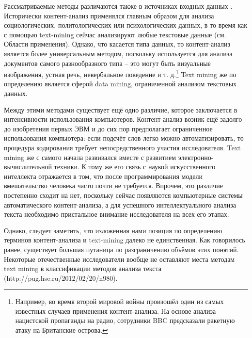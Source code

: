 Рассматриваемые методы различаются также в источниках входных данных \cite[стр. 735]{tm_and_ca}. Исторически контент-анализ применялся главным образом для анализа социологических, политологических или психологических данных, в то время как с помощью text-mining сейчас анализируют любые текстовые данные (см. Области применения). Однако, что касается типа данных, то контент-анализ является более универсальным методом, поскольку используется для анализа документов самого разнообразного типа -- это могут быть визуальные изображения, устная речь, невербальное поведение и т. д.\footnote{Например, во время второй мировой войны произошёл один из самых известных случаев применения контент-анализа. На основе анализа нацистской пропаганды на радио, сотрудники BBC предсказали ракетную атаку на Британские острова.} Text mining же по определению является сферой data mining, ограниченной анализом текстовых данных.

Между этими методами существует ещё одно различие, которое заключается в интенсивности использования компьютеров. Контент-анализ возник ещё задолго до изобретения первых ЭВМ и до сих пор предполагает ограниченное использования компьютера: если подсчёт слов легко можно автоматизировать, то процедура кодирования требует непосредственного участия исследователя. Text mining же с самого начала развивался вместе с развитием электронно-вычислительной техники. К тому же его связь с наукой искусственного интеллекта отражается в том, что после программирования модели вмешательство человека часто почти не требуется. Впрочем, это различие постепенно сходит на нет, поскольку сейчас появляются компьютерные системы автоматического контент-анализа, а для успешного интеллектуального анализа текста необходимо пристальное внимание исследователя на всех его этапах.

Однако, следует заметить, что изложенная нами позиция по определению терминов контент-анализа и text-mining далеко не единственная. Как говорилось ранее, существует большая путаница по разграничению объёмов этих понятий. Некоторые отечественные исследователи вообще не оставляют места методам text mining в классификации методов анализа текста (http://pug.hse.ru/2012/02/20/n980).
\clearpage